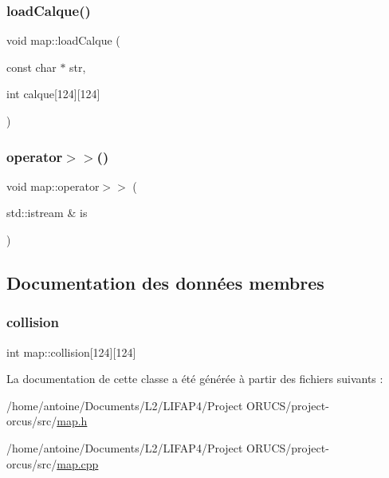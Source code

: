 \subsubsection{\texorpdfstring{load\+Calque()}{loadCalque()}}
{\footnotesize\ttfamily void map\+::load\+Calque (\begin{DoxyParamCaption}\item[{const char $\ast$}]{str,  }\item[{int}]{calque\mbox{[}124\mbox{]}\mbox{[}124\mbox{]} }\end{DoxyParamCaption})}

\mbox{\label{classmap_a495874310631e8c0b0329984c05b9bd7}} 
\subsubsection{\texorpdfstring{operator$>$$>$()}{operator>>()}}
{\footnotesize\ttfamily void map\+::operator$>$$>$ (\begin{DoxyParamCaption}\item[{std\+::istream \&}]{is }\end{DoxyParamCaption})}



\subsection{Documentation des données membres}
\mbox{\label{classmap_a4688a2204f0b6301769b4363be830184}} 
\subsubsection{\texorpdfstring{collision}{collision}}
{\footnotesize\ttfamily int map\+::collision\mbox{[}124\mbox{]}\mbox{[}124\mbox{]}}



La documentation de cette classe a été générée à partir des fichiers suivants \+:\begin{DoxyCompactItemize}
\item 
/home/antoine/\+Documents/\+L2/\+L\+I\+F\+A\+P4/\+Project O\+R\+U\+C\+S/project-\/orcus/src/\hyperlink{map_8h}{map.\+h}\item 
/home/antoine/\+Documents/\+L2/\+L\+I\+F\+A\+P4/\+Project O\+R\+U\+C\+S/project-\/orcus/src/\hyperlink{map_8cpp}{map.\+cpp}\end{DoxyCompactItemize}
